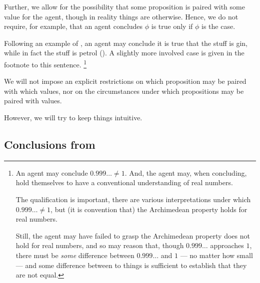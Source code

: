 \begin{note}
  Further, we allow for the possibility that some proposition is paired with some value for the agent, though in reality things are otherwise.
  Hence, we do not require, for example, that an agent concludes \(\phi\) is true only if \(\phi\) is the case.

  Following an example of \citeauthor{Williams:1979wi}, an agent may conclude it is true that the stuff is gin, while in fact the stuff is petrol (\citeyear[18]{Williams:1979wi}).
  A slightly more involved case is given in the footnote to this sentence.%
  \footnote{
    An agent may conclude \(0.999\dots \ne 1\).
    And, the agent may, when concluding, hold themselves to have a conventional understanding of real numbers.

    The qualification is important, there are various interpretations under which \(0.999\dots \ne 1\), but (it is convention that) the Archimedean property holds for real numbers.

    Still, the agent may have failed to grasp the Archimedean property does not hold for real numbers, and so may reason that, though \(0.999\dots\) approaches \(1\), there must be \emph{some} difference between \(0.999\dots\) and \(1\) --- no matter how small --- and some difference between to things is sufficient to establish that they are not equal.
  }
\end{note}

\begin{note}
  We will not impose an explicit restrictions on which proposition may be paired with which values, nor on the circumstances under which propositions may be paired with values.

  However, we will try to keep things intuitive.
\end{note}

\subsection{Conclusions from }
\label{sec:pools-premises}

